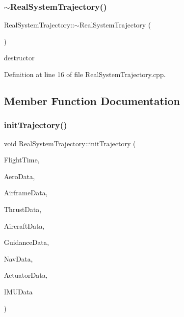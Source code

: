 \subsubsection{\texorpdfstring{$\sim$\+Real\+System\+Trajectory()}{~RealSystemTrajectory()}}
{\footnotesize\ttfamily Real\+System\+Trajectory\+::$\sim$\+Real\+System\+Trajectory (\begin{DoxyParamCaption}{ }\end{DoxyParamCaption})}



destructor 



Definition at line 16 of file Real\+System\+Trajectory.\+cpp.



\subsection{Member Function Documentation}
\mbox{\label{class_real_system_trajectory_a41ae049eeff69ea6b9daef8027a142a3}} 
\subsubsection{\texorpdfstring{init\+Trajectory()}{initTrajectory()}}
{\footnotesize\ttfamily void Real\+System\+Trajectory\+::init\+Trajectory (\begin{DoxyParamCaption}\item[{\hyperlink{group___tools_ga3f1431cb9f76da10f59246d1d743dc2c}{Float64} \&}]{Flight\+Time,  }\item[{Aerodynamic\+Struct \&}]{Aero\+Data,  }\item[{Airframe\+Struct \&}]{Airframe\+Data,  }\item[{Thrust\+Struct \&}]{Thrust\+Data,  }\item[{Aircraft\+Struct \&}]{Aircraft\+Data,  }\item[{Guidance\+Struct \&}]{Guidance\+Data,  }\item[{Navigation\+Struct \&}]{Nav\+Data,  }\item[{Actuator\+Struct \&}]{Actuator\+Data,  }\item[{I\+M\+U\+Struct \&}]{I\+M\+U\+Data }\end{DoxyParamCaption})\hspace{0.3cm}{\ttfamily [virtual]}}



